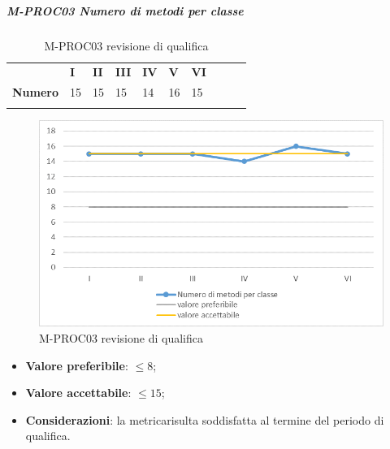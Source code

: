 \subparagraph{M-PROC03 Numero di metodi per classe} \mbox{}
\begin{longtable}[H!] {						
		>{}p{50mm}  		
		>{}p{8mm}
		>{}p{8mm}		
		>{}p{8mm}		
		>{}p{8mm}		
		>{}p{8mm}		
		>{}p{8mm}
		>{}p{8mm}
		>{}p{8mm}
		>{}p{8mm}
	}
	\rowcolor{gray!50}
	\textbf{} & \textbf{I} & \textbf{II} & \textbf{III} & \textbf{IV} & \textbf{V} & \textbf{VI} \TBstrut \\ [2mm]
	\textbf{Numero} & 15 & 15 & 15 & 14 & 16 & 15 \TBstrut \\ [2mm]
	\rowcolor{white}
	\caption{M-PROC03 revisione di qualifica}
\end{longtable}
\begin{figure}[H] 	
	\includegraphics[width=\linewidth]{./img/grafici/RQ3.png}	
	\caption{M-PROC03 revisione di qualifica}	
\end{figure}
\begin{itemize}
	\item \textbf{Valore preferibile}: $\le 8$;
	\item \textbf{Valore accettabile}: $\le 15$;
	\item \textbf{Considerazioni}: la metrica\glosp risulta soddisfatta al termine del periodo di qualifica.
\end{itemize}

